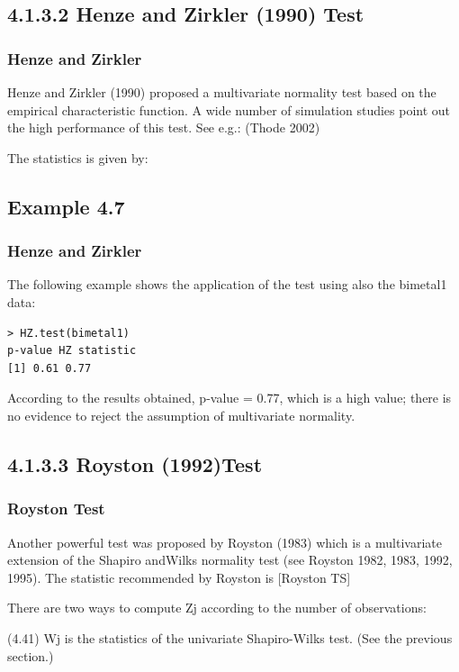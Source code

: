 \documentclass[]{beamer}
\begin{document}
\subsection{4.1.3.2 Henze and Zirkler (1990) Test}
\begin{frame}
	\frametitle{Henze and Zirkler}
	\large
Henze and Zirkler (1990) proposed a multivariate normality test based on the
empirical characteristic function. A wide number of simulation studies point out
the high performance of this test. See e.g.: (Thode 2002)

The statistics is given by:
\end{frame}
\subsection{Example 4.7}
\begin{frame}[fragile]
\frametitle{Henze and Zirkler}
\large
The following example shows the application of the test using also the bimetal1
data:
\begin{verbatim}
> HZ.test(bimetal1)
p-value HZ statistic
[1] 0.61 0.77
\end{verbatim}
According to the results obtained, p-value = 0.77, which is a high value; there is
no evidence to reject the assumption of multivariate normality.
\end{frame}
\subsection{4.1.3.3 Royston (1992)Test}
\begin{frame}
	\frametitle{Royston Test}
Another powerful test was proposed by Royston (1983) which is a multivariate extension
of the Shapiro andWilks normality test (see Royston 1982, 1983, 1992, 1995).
The statistic recommended by Royston is
[Royston TS]

There are two ways to compute Zj according to the number of  observations:


(4.41)
Wj is the statistics of the univariate Shapiro-Wilks test. (See the previous
section.)
\end{frame}
\end{document}
